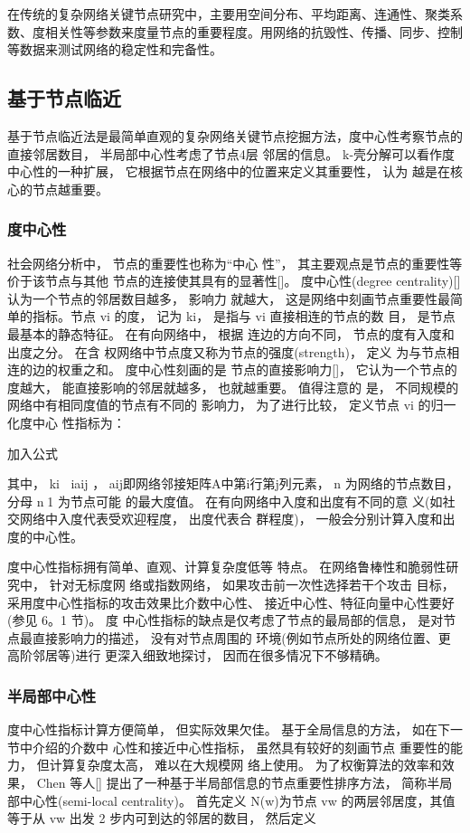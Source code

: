 	在传统的复杂网络关键节点研究中，主要用空间分布、平均距离、连通性、聚类系数、度相关性等参数来度量节点的重要程度。用网络的抗毁性、传播、同步、控制等数据来测试网络的稳定性和完备性。
				
	\subsection{基于节点临近}
		基于节点临近法是最简单直观的复杂网络关键节点挖掘方法，度中心性考察节点的直接邻居数目， 半局部中心性考虑了节点4层 邻居的信息。 k-壳分解可以看作度中心性的一种扩展， 它根据节点在网络中的位置来定义其重要性， 认为 越是在核心的节点越重要。
	\subsubsection{度中心性}
	社会网络分析中， 节点的重要性也称为“中心 性”， 其主要观点是节点的重要性等价于该节点与其他 节点的连接使其具有的显著性[]。 度中心性(degree centrality)[]认为一个节点的邻居数目越多， 影响力 就越大， 这是网络中刻画节点重要性最简单的指标。节点 vi 的度， 记为 ki， 是指与 vi 直接相连的节点的数 目， 是节点最基本的静态特征。 在有向网络中， 根据 连边的方向不同， 节点的度有入度和出度之分。 在含 权网络中节点度又称为节点的强度(strength)， 定义 为与节点相连的边的权重之和。 度中心性刻画的是 节点的直接影响力[]， 它认为一个节点的度越大， 能直接影响的邻居就越多， 也就越重要。 值得注意的 是， 不同规模的网络中有相同度值的节点有不同的 影响力， 为了进行比较， 定义节点 vi 的归一化度中心 性指标为：

				加入公式

				其中， ki iaij ， aij即网络邻接矩阵A中第i行第j列元素， n 为网络的节点数目， 分母 n1 为节点可能 的最大度值。 在有向网络中入度和出度有不同的意 义(如社交网络中入度代表受欢迎程度， 出度代表合 群程度)， 一般会分别计算入度和出度的中心性。

				度中心性指标拥有简单、直观、计算复杂度低等 特点。 在网络鲁棒性和脆弱性研究中， 针对无标度网 络或指数网络， 如果攻击前一次性选择若干个攻击 目标， 采用度中心性指标的攻击效果比介数中心性、 接近中心性、特征向量中心性要好(参见 6。1 节)。 度 中心性指标的缺点是仅考虑了节点的最局部的信息， 是对节点最直接影响力的描述， 没有对节点周围的 环境(例如节点所处的网络位置、更高阶邻居等)进行 更深入细致地探讨， 因而在很多情况下不够精确。
	\subsubsection{半局部中心性}
	度中心性指标计算方便简单， 但实际效果欠佳。 基于全局信息的方法， 如在下一节中介绍的介数中 心性和接近中心性指标， 虽然具有较好的刻画节点 重要性的能力， 但计算复杂度太高， 难以在大规模网 络上使用。 为了权衡算法的效率和效果， Chen 等人[] 提出了一种基于半局部信息的节点重要性排序方法， 简称半局部中心性(semi-local centrality)。 首先定义 N(w)为节点 vw 的两层邻居度，其值等于从 vw 出发 2 步内可到达的邻居的数目， 然后定义

